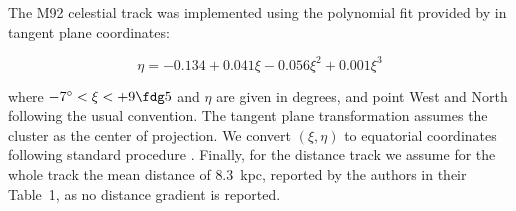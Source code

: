 The M92 celestial track was implemented using the polynomial fit provided by \citet{Thomas2020} in tangent plane coordinates:

\[ \eta = -0.134 +0.041\xi -0.056\xi^2 +0.001\xi^3 \] 

where $-7^\circ<\xi<+9\fdg5$ and $\eta$ are given in degrees, and point West and North following the usual convention. The tangent plane transformation assumes the cluster as the center of projection. We convert $(\xi,\eta)$ to equatorial coordinates following standard procedure \citep[e.g. see Chapter 9 in][]{BB2005}. Finally, for the distance track we assume for the whole track the mean distance of $8.3$~kpc, reported by the authors in their Table~1, as no distance gradient is reported.

